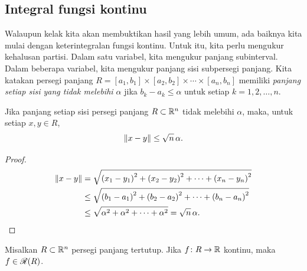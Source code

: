 \subsection{Integral fungsi kontinu}

Walaupun kelak kita akan membuktikan hasil yang lebih umum, ada baiknya kita
mulai dengan keterintegralan fungsi kontinu. Untuk itu, kita perlu mengukur
kehalusan partisi. Dalam satu variabel, kita mengukur panjang subinterval.
Dalam beberapa variabel, kita mengukur panjang sisi subpersegi panjang.
Kita katakan persegi panjang $R = [a_1,b_1] \times
[a_2,b_2] \times \cdots \times
[a_n,b_n]$ memiliki \emph{panjang setiap sisi yang tidak melebihi $\alpha$}%
 jika
$b_k-a_k \leq \alpha$ untuk setiap $k=1,2,\ldots,n$.

\begin{prop} \label{prop:diameterrectangle}
Jika panjang setiap sisi persegi panjang $R \subset {\mathbb{R}}^n$ tidak melebihi
$\alpha$, maka, untuk setiap $x,y \in R$,
\begin{equation*}
\lVert {x-y} \rVert \leq \sqrt{n} \, \alpha .
\end{equation*}
\end{prop}

\begin{proof}
\begin{equation*}
\begin{split}
\lVert {x-y} \rVert 
& =
\sqrt{
{(x_1-y_1)}^2
+
{(x_2-y_2)}^2
+ \cdots +
{(x_n-y_n)}^2
}
\\
& \leq
\sqrt{
{(b_1-a_1)}^2
+
{(b_2-a_2)}^2
+ \cdots +
{(b_n-a_n)}^2
}
\\
& \leq
\sqrt{
{\alpha}^2
+
{\alpha}^2
+ \cdots +
{\alpha}^2
}
=
\sqrt{n} \, \alpha .  \qedhere
\end{split}
\end{equation*}
\end{proof}


\begin{thm} \label{mv:thm:contintrect}
Misalkan $R \subset {\mathbb{R}}^n$ persegi panjang tertutup. Jika
$f \colon R \to {\mathbb{R}}$ kontinu, maka $f \in {\mathscr{R}}(R)$.
\end{thm}

